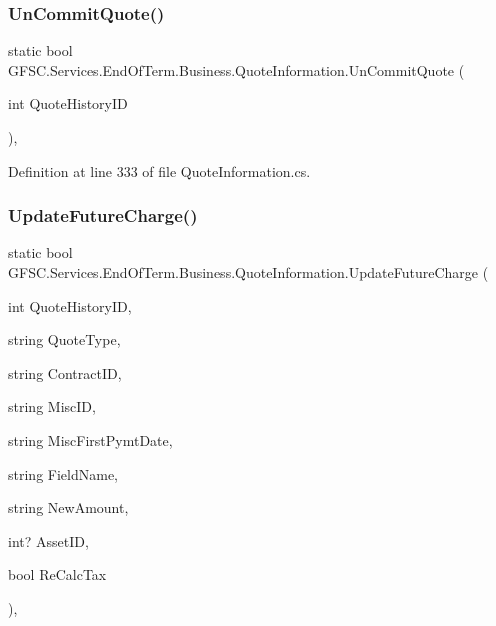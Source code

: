 \subsubsection{\texorpdfstring{Un\+Commit\+Quote()}{UnCommitQuote()}}
{\footnotesize\ttfamily static bool G\+F\+S\+C.\+Services.\+End\+Of\+Term.\+Business.\+Quote\+Information.\+Un\+Commit\+Quote (\begin{DoxyParamCaption}\item[{int}]{Quote\+History\+ID }\end{DoxyParamCaption})\hspace{0.3cm}{\ttfamily [static]}, {\ttfamily [package]}}



Definition at line 333 of file Quote\+Information.\+cs.

\mbox{\label{class_g_f_s_c_1_1_services_1_1_end_of_term_1_1_business_1_1_quote_information_acbd750495a03f04ea5010ea3de3cf470}} 
\subsubsection{\texorpdfstring{Update\+Future\+Charge()}{UpdateFutureCharge()}}
{\footnotesize\ttfamily static bool G\+F\+S\+C.\+Services.\+End\+Of\+Term.\+Business.\+Quote\+Information.\+Update\+Future\+Charge (\begin{DoxyParamCaption}\item[{int}]{Quote\+History\+ID,  }\item[{string}]{Quote\+Type,  }\item[{string}]{Contract\+ID,  }\item[{string}]{Misc\+ID,  }\item[{string}]{Misc\+First\+Pymt\+Date,  }\item[{string}]{Field\+Name,  }\item[{string}]{New\+Amount,  }\item[{int?}]{Asset\+ID,  }\item[{bool}]{Re\+Calc\+Tax }\end{DoxyParamCaption})\hspace{0.3cm}{\ttfamily [static]}, {\ttfamily [package]}}



